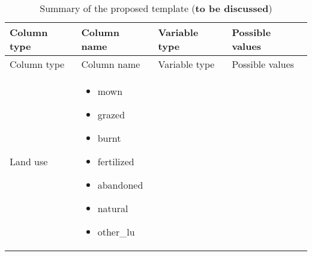 \documentclass[table]{article}
\providecommand{\tightlist}{%
  \setlength{\itemsep}{0pt}\setlength{\parskip}{0pt}}
\begin{document}
\begin{longtable}[]{@{}llll@{}}
\caption{Summary of the proposed template (\textbf{to be
discussed})}\tabularnewline
\toprule
\begin{minipage}[b]{0.15\columnwidth}\raggedright\strut
Column type\strut
\end{minipage} & \begin{minipage}[b]{0.30\columnwidth}\raggedright\strut
Column name\strut
\end{minipage} & \begin{minipage}[b]{0.16\columnwidth}\raggedright\strut
Variable type\strut
\end{minipage} & \begin{minipage}[b]{0.28\columnwidth}\raggedright\strut
Possible values\strut
\end{minipage}\tabularnewline
\midrule
\endfirsthead
\toprule
\begin{minipage}[b]{0.15\columnwidth}\raggedright\strut
Column type\strut
\end{minipage} & \begin{minipage}[b]{0.30\columnwidth}\raggedright\strut
Column name\strut
\end{minipage} & \begin{minipage}[b]{0.16\columnwidth}\raggedright\strut
Variable type\strut
\end{minipage} & \begin{minipage}[b]{0.28\columnwidth}\raggedright\strut
Possible values\strut
\end{minipage}\tabularnewline
\midrule
\endhead
\begin{minipage}[t]{0.24\columnwidth}\raggedright\strut
Land use\strut
\end{minipage} & \begin{minipage}[t]{0.24\columnwidth}\raggedright\strut
\begin{itemize}
\tightlist
\item
  mown
\item
  grazed
\item
  burnt
\item
  fertilized
\item
  abandoned
\item
  natural
\item
  other\_lu
\end{itemize}\strut
\end{minipage} & \begin{minipage}[t]{0.24\columnwidth}\raggedright\strut
\begin{itemize}

\end{itemize}
\end{minipage}
\end{longtable}
\end{document}

